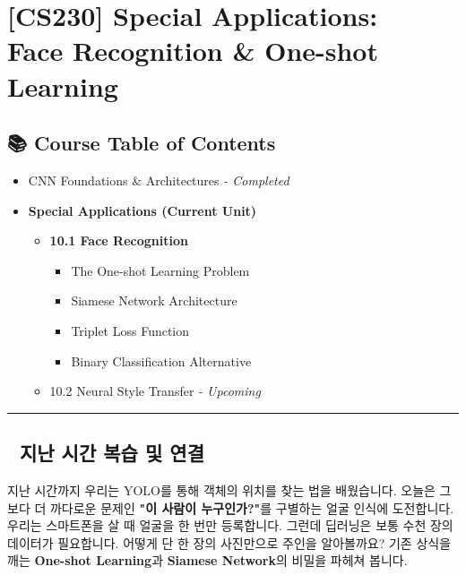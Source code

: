 \documentclass[11pt,a4paper]{book}
\theoremstyle{definition}
\begin{document}
\chapter{[CS230] Special Applications: \\ Face Recognition \& One-shot Learning}
\label{ch:lecture36}

\section*{📚 Course Table of Contents}
\begin{itemize}
    \item[Chapter 1-9.] CNN Foundations \& Architectures \textit{- Completed}
    \item[\textbf{Chapter 10.}] \textbf{Special Applications (Current Unit)}
    \begin{itemize}
        \item \textbf{10.1 Face Recognition}
        \begin{itemize}
            \item The One-shot Learning Problem
            \item Siamese Network Architecture
            \item Triplet Loss Function
            \item Binary Classification Alternative
        \end{itemize}
        \item 10.2 Neural Style Transfer \textit{- Upcoming}
    \end{itemize}
\end{itemize}

\vspace{0.5cm}
\hrule
\vspace{0.5cm}

\section*{🔗 지난 시간 복습 및 연결}
지난 시간까지 우리는 YOLO를 통해 객체의 위치를 찾는 법을 배웠습니다.
오늘은 그보다 더 까다로운 문제인 \textbf{"이 사람이 누구인가?"}를 구별하는 얼굴 인식에 도전합니다.
우리는 스마트폰을 살 때 얼굴을 한 번만 등록합니다. 그런데 딥러닝은 보통 수천 장의 데이터가 필요합니다. 어떻게 단 한 장의 사진만으로 주인을 알아볼까요? 기존 상식을 깨는 \textbf{One-shot Learning}과 \textbf{Siamese Network}의 비밀을 파헤쳐 봅니다.

\end{document}
